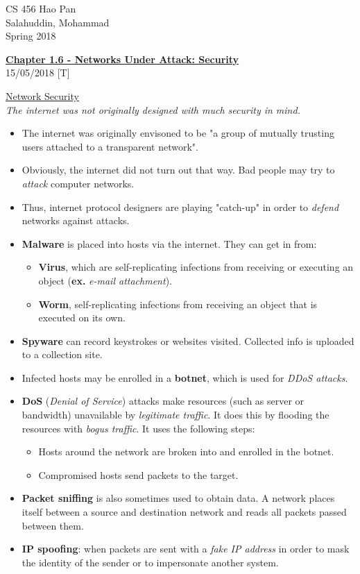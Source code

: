 \documentclass{article}
\begin{document}
\noindent
{CS 456 \hfill Hao Pan}\\
{Salahuddin, Mohammad}\\
{Spring 2018}


\begin{center}
\underline{\large \bf Chapter 1.6 - Networks Under Attack: Security}\\
\noindent
{\hfill 15/05/2018 [T]}
\end{center}

\underline{Network Security}\\

\vspace{-4mm}
{\it The internet was not originally designed with much security in mind.}

\begin{itemize}
\item The internet was originally envisoned to be "a group of mutually trusting users attached to a transparent network".
\item Obviously, the internet did not turn out that way. Bad people may try to {\it attack} computer networks.
\item Thus, internet protocol designers are playing "catch-up" in order to {\it defend} networks against attacks.
\item {\bf Malware} is placed into hosts via the internet. They can get in from:
\begin{itemize}
\item {\bf Virus}, which are self-replicating infections from receiving or executing an object ({\bf ex.} {\it e-mail attachment}).
\item {\bf Worm}, self-replicating infections from receiving an object that is executed on its own.
\end{itemize}
\item {\bf Spyware} can record keystrokes or websites visited. Collected info is uploaded to a collection site.
\item Infected hosts may be enrolled in a {\bf botnet}, which is used for {\it DDoS attacks}.
\item {\bf DoS} ({\it Denial of Service}) attacks make resources (such as server or bandwidth) unavailable by {\it legitimate traffic}. It does this by flooding the resources with {\it bogus traffic}. It uses the following steps:
\begin{itemize}
\item Hosts around the network are broken into and enrolled in the botnet.
\item Compromised hosts send packets to the target.
\end{itemize}
\item {\bf Packet sniffing} is also sometimes used to obtain data. A network places itself between a source and destination network and reads all packets passed between them.
\item {\bf IP spoofing}: when packets are sent with a {\it fake IP address} in order to mask the identity of the sender or to impersonate another system.
\end{itemize}
\end{document}
